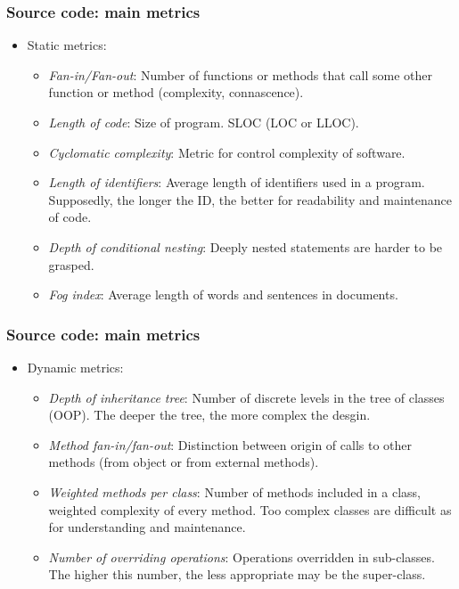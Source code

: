 \documentclass{beamer}
\begin{document}
\begin{frame}
 \frametitle{Source code: main metrics}
 \begin{itemize}
 \item Static metrics:
 \begin{itemize}
  \item \textit{Fan-in/Fan-out}: Number of functions or methods that call some other
function or method (complexity, connascence).
  \item \textit{Length of code}: Size of program. SLOC (LOC or LLOC).
  \item \textit{Cyclomatic complexity}: Metric for control complexity of software.
  \item \textit{Length of identifiers}: Average length of identifiers used in a program.
Supposedly, the longer the ID, the better for readability and maintenance of code.
  \item \textit{Depth of conditional nesting}: Deeply nested statements are harder to be grasped.
  \item \textit{Fog index}: Average length of words and sentences in documents.
 \end{itemize}

 \end{itemize}
\end{frame}


\begin{frame}
 \frametitle{Source code: main metrics}
 \begin{itemize}
 \item Dynamic metrics:
 \begin{itemize}
  \item \textit{Depth of inheritance tree}: Number of discrete levels in the tree of
classes (OOP). The deeper the tree, the more complex the desgin.
  \item \textit{Method fan-in/fan-out}: Distinction between origin of calls to other
methods (from object or from external methods).
  \item \textit{Weighted methods per class}: Number of methods included in a class, weighted complexity
of every method. Too complex classes are difficult as for understanding and maintenance.
  \item \textit{Number of overriding operations}: Operations overridden in sub-classes. The higher this
number, the less appropriate may be the super-class.
 \end{itemize}

 \end{itemize}
\end{frame}
\end{document}
